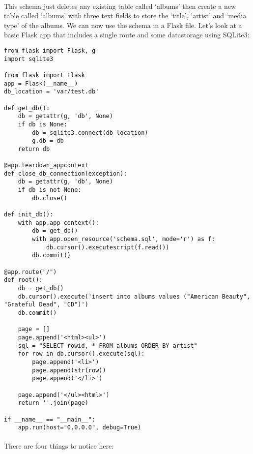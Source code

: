 \documentclass[12pt, a4paper, twoside]{book}
\begin{document}
\paragraph{} This schema just deletes any existing table called `albums' then create a new table called `albums' with three text fields to store the `title', `artist' and `media type' of the albums. We can now use the schema in a Flask file. Let's look at a basic Flask app that includes a single route and some datastorage using SQLite3:

\begin{lstlisting}
from flask import Flask, g
import sqlite3

from flask import Flask
app = Flask(__name__)
db_location = 'var/test.db'

def get_db():
    db = getattr(g, 'db', None)
    if db is None:
        db = sqlite3.connect(db_location)
        g.db = db
    return db

@app.teardown_appcontext
def close_db_connection(exception):
    db = getattr(g, 'db', None)
    if db is not None:
        db.close()

def init_db():
    with app.app_context():
        db = get_db() 
        with app.open_resource('schema.sql', mode='r') as f:
            db.cursor().executescript(f.read())
        db.commit()

@app.route("/")
def root():
    db = get_db()
    db.cursor().execute('insert into albums values ("American Beauty", "Grateful Dead", "CD")')
    db.commit()

    page = []
    page.append('<html><ul>')
    sql = "SELECT rowid, * FROM albums ORDER BY artist"
    for row in db.cursor().execute(sql):
        page.append('<li>')
        page.append(str(row))
        page.append('</li>')

    page.append('</ul><html>')
    return ''.join(page)

if __name__ == "__main__":
    app.run(host="0.0.0.0", debug=True)
\end{lstlisting}

\paragraph{} There are four things to notice here:
\end{document}
